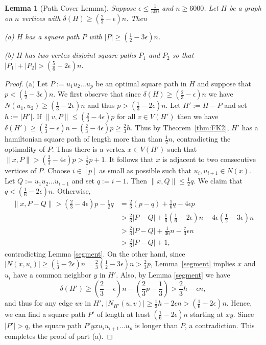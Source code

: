 \documentclass[oneside,12pt]{memoir}
\newtheorem{lemma}[theorem]{Lemma}
\newcommand{\ep}{\epsilon}
\begin{document}
\begin{lemma}[Path Cover Lemma]
\label{pathcover} Suppose  
$\ep\le\frac{1}{500}$ and $n\ge6000$. Let $H$ be a graph on $n$ vertices with $\delta(H)\geq\left(\frac{2}{3}-\ep\right)n$.  %
Then 

\textup{(a)} $H$ has a square path $P$ with $|P|\geq(\frac{1}{2}-3\ep)n$. 
\label{longpath}

\textup{(b)} $H$ has two vertex disjoint square paths $P_{1}$ and $P_{2}$ so that $|P_{1}|+|P_{2}|>(\frac{5}{6}-2\ep)n$. \label{twopaths} \end{lemma}
\begin{proof}
(a) Let $P:=u_{1}u_{2}...u_{p}$ be an optimal square path in $H$ and suppose that $p<(\frac{1}{2}-3\ep)n$.  We first observe that since $\delta(H)\geq (\frac{2}{3}-\ep)n$ we have $N(u_1,u_2)\geq (\frac{1}{3}-2\ep)n$ and thus $p>(\frac{1}{3}-2\ep)n$.
Let $H':=H-P$ and set $h:=|H'|$. If $\|v,P\|\leq (\frac{2}{3}-4\ep)p$ for all $v\in V(H')$ then we have $\delta(H')\geq(\frac{2}{3}-\ep)n-(\frac{2}{3}-4\ep) p \geq\frac{2}{3}h$.
Thus by Theorem~\ref{thm:FK2},  $H'$ has a hamiltonian square path of length more than than $\frac{1}{2}n$, contradicting the optimality of $P$. Thus there is a vertex $x\in V(H')$ such that $\|x,P\|>(\frac{2}{3}-4\ep)p>\frac{1}{2}p+1$. It follows that $x$ is adjacent to two consecutive vertices of $P$. Choose $i\in[p]$ as small as possible such that $u_{i},u_{i+1}\in N(x)$. Let $Q:=u_{1}u_{2}...u_{i-1}$ and set $q:=i-1$. Then $\|x,Q\|\leq\frac{1}{2}q$. We claim that $q<(\frac{1}{6}-2\ep)n$.
Otherwise, \begin{align*}
\|x,P-Q\|>(\frac{2}{3}-4\ep)p-\frac{1}{2}q & =\frac{2}{3}(p-q)+\frac{1}{6}q-4\ep p\\
 & >\frac{2}{3}|P-Q|+\frac{1}{6}(\frac{1}{6}-2\ep)n-4\ep(\frac{1}{2}-3\ep)n\\
 & >\frac{2}{3}|P-Q|+\frac{1}{36}n-\frac{7}{3}\ep n\\
 & >\frac{2}{3}|P-Q|+1,  \end{align*}
contradicting Lemma \ref{segment}. On the other hand, since $|N(x,u_{i})|\geq(\frac{1}{3} -2\ep)n=\frac{2}{3} (\frac{1}{2}-3\ep)n>\frac{2}{3}p$, Lemma~\ref{segment} implies $x$ and $u_{i}$ have a common neighbor $y$ in $H'$. Also, by Lemma \ref{segment} we have \[
\delta(H')\geq(\frac{2}{3}-\ep)n-(\frac{2}{3}p-\frac{1}{3})>\frac{2}{3}h-\ep n,\] and thus for any edge $uv$ in $H'$, $|N_{H'}(u,v)|\geq\frac{1}{3}h-2\ep n>(\frac{1}{6}-2\ep)n$. Hence, we can find a square path $P'$ of length at least $(\frac{1}{6}-2\ep)n$ starting at $xy$. Since $|P'|>q$, the square path $P'yxu_{i}u_{i+1}...u_{p}$ is longer than $P$, a contradiction. This completes the proof of part (a).


\end{proof}
\end{document}
